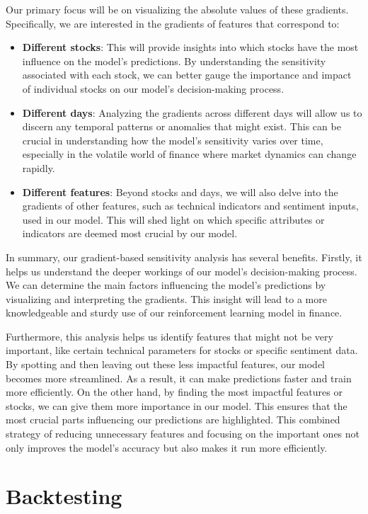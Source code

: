 \documentclass[12pt]{article}
\begin{document}
Our primary focus will be on visualizing the absolute values of these gradients. Specifically, we are interested in the gradients of features that correspond to:
\begin{itemize}
    \item \textbf{Different stocks}: This will provide insights into which stocks have the most influence on the model's predictions. By understanding the sensitivity associated with each stock, we can better gauge the importance and impact of individual stocks on our model's decision-making process.

    \item \textbf{Different days}: Analyzing the gradients across different days will allow us to discern any temporal patterns or anomalies that might exist. This can be crucial in understanding how the model's sensitivity varies over time, especially in the volatile world of finance where market dynamics can change rapidly.

    \item \textbf{Different features}: Beyond stocks and days, we will also delve into the gradients of other features, such as technical indicators and sentiment inputs, used in our model. This will shed light on which specific attributes or indicators are deemed most crucial by our model.
\end{itemize}
In summary, our gradient-based sensitivity analysis has several benefits. Firstly, it helps us understand the deeper workings of our model's decision-making process. We can determine the main factors influencing the model's predictions by visualizing and interpreting the gradients. This insight will lead to a more knowledgeable and sturdy use of our reinforcement learning model in finance.

Furthermore, this analysis helps us identify features that might not be very important, like certain technical parameters for stocks or specific sentiment data. By spotting and then leaving out these less impactful features, our model becomes more streamlined. As a result, it can make predictions faster and train more efficiently. On the other hand, by finding the most impactful features or stocks, we can give them more importance in our model. This ensures that the most crucial parts influencing our predictions are highlighted. This combined strategy of reducing unnecessary features and focusing on the important ones not only improves the model's accuracy but also makes it run more efficiently.


\section{Backtesting} %
\label{subsec:backtest}
\end{document}
